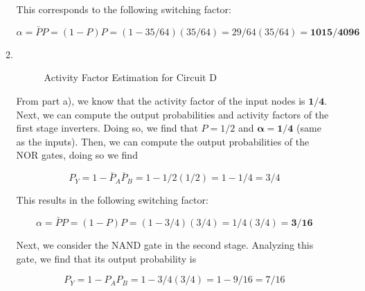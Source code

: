 \documentclass[fleqn]{article}
\begin{document}
\begin{enumerate}
\begin{enumerate}
			This corresponds to the following switching factor:
			
			\begin{equation*}
				\alpha = \bar{P}P = (1 - P)P = (1 - 35/64)(35/64) = 29/64(35/64) = \mathbf{1015/4096}
			\end{equation*}
			
			\item ~
			
			\begin{figure}[H]				
				\centerline{}
				\caption{Activity Factor Estimation for Circuit D}
				\label{fig::activity_factor_d}
			\end{figure}
			
			From part a), we know that the activity factor of the input nodes is $\mathbf{1/4}$. Next, we can compute the output probabilities and activity factors of the first stage inverters. Doing so, we find that $P = 1/2$ and $\mathbf{\alpha = 1/4}$ (same as the inputs). Then, we can compute the output probabilities of the NOR gates, doing so we find

			\begin{equation*}
				P_Y = 1 - \bar{P}_A\bar{P}_B = 1 - 1/2(1/2) = 1 - 1/4 = 3/4
			\end{equation*}
			
			This results in the following switching factor:
			
			\begin{equation*}
				\alpha = \bar{P}P = (1 - P)P = (1 - 3/4)(3/4) = 1/4(3/4) = \mathbf{3/16}
			\end{equation*}
			
			Next, we consider the NAND gate in the second stage. Analyzing this gate, we find that its output probability is
			
			\begin{equation*}
				P_Y = 1 - P_AP_B = 1 - 3/4(3/4) = 1 - 9/16 = 7/16
			\end{equation*}
			

\end{enumerate}
\end{enumerate}
\end{document}
